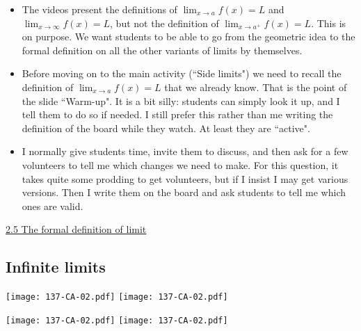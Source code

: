 \documentclass[11pt]{article}
\newcommand{\n}{\newpage}
\newcommand {\DS} [1] {${\displaystyle #1}$}
\newcommand{\nl}{\hfill \vspace{-1.1\baselineskip}} %
\newcommand{\vv}{\hspace{8mm} \href{https://www.youtube.com/watch?v=eCBM1tVHDqo&list=PLlwePzQY_wW8P_I8BFgm0-upywEwTKd8_&index=5}{2.5 The formal definition of limit}}
\begin{document}
\begin{comments}
\nl
	\begin{itemize}
		\item  The videos present the definitions of \DS{\lim_{x \to a}f(x) = L} and \DS{\lim_{x \to \infty} f(x) = L}, but not the definition of \DS{\lim_{x \to a^+} f(x) = L}.  This is on purpose.  We want students to be able to go from the geometric idea to the formal definition on all the other variants of limits by themselves.
		\item Before moving on to the main activity (``Side limits") we need to recall the definition of \DS{\lim_{x \to a}f(x) = L} that we already know.  That is the point of the slide ``Warm-up".  It is a bit silly: students can simply look it up, and I tell them to do so if needed.  I still prefer this rather than me writing the definition of the board while they watch.  At least they are ``active".
		\item I normally give students time, invite them to discuss, and then ask for a few volunteers to tell me which changes we need to make.  For this question, it takes quite some prodding to get volunteers, but if I insist I may get various versions.  Then I write them on the board and ask students to tell me which ones are valid.
	\end{itemize}
\end{comments}

\begin{videos}
\vv
\end{videos}

\n
\newpage
\subsection{Infinite limits} 

\begin{center}
{ \texttt{[image: 137-CA-02.pdf]}}
\quad
{ \texttt{[image: 137-CA-02.pdf]}}

{ \texttt{[image: 137-CA-02.pdf]}}
\quad
{ \texttt{[image: 137-CA-02.pdf]}}
\end{center}
\end{document}
